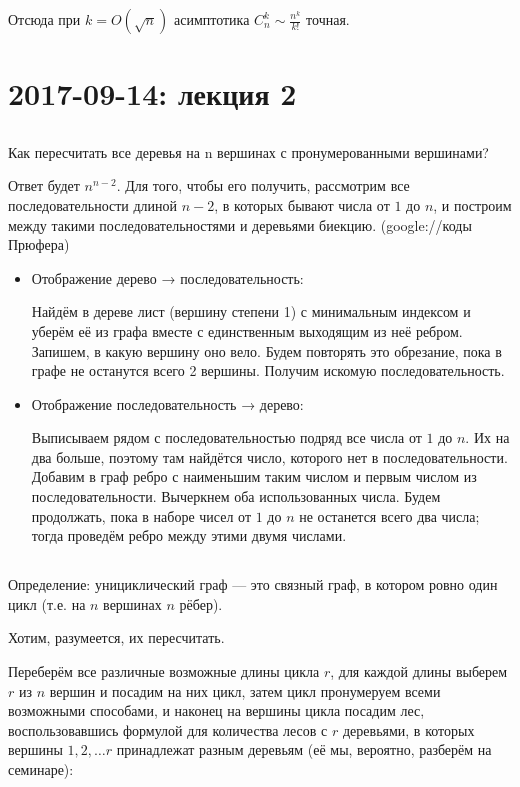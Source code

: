 \documentclass[12pt]{article}
\begin{document}
Отсюда при $k = O(\sqrt{n})$ асимптотика $C^k_n \sim \frac {n^k} {k!}$ точная.

\section{2017-09-14: лекция 2}

\subsection{}

Как пересчитать все деревья на n вершинах с пронумерованными вершинами?

Ответ будет $n^{n-2}$. Для того, чтобы его получить, рассмотрим все последовательности длиной $n-2$, в которых бывают числа от $1$ до $n$, и построим между такими последовательностями и деревьями биекцию. (google://коды Прюфера)

\begin{itemize}
\item Отображение дерево → последовательность:

Найдём в дереве лист (вершину степени 1) с минимальным индексом и уберём её из графа вместе с единственным выходящим из неё ребром. Запишем, в какую вершину оно вело. Будем повторять это обрезание, пока в графе не останутся всего 2 вершины. Получим искомую последовательность.

\item Отображение последовательность → дерево:

Выписываем рядом с последовательностью подряд все числа от $1$ до $n$. Их на два больше, поэтому там найдётся число, которого нет в последовательности. Добавим в граф ребро с наименьшим таким числом и первым числом из последовательности. Вычеркнем оба использованных числа. Будем продолжать, пока в наборе чисел от $1$ до $n$ не останется всего два числа; тогда проведём ребро между этими двумя числами.
\end{itemize}

\subsection{}

Определение: унициклический граф — это связный граф, в котором ровно один цикл (т.е. на $n$ вершинах $n$ рёбер).

Хотим, разумеется, их пересчитать.

Переберём все различные возможные длины цикла $r$, для каждой длины выберем $r$ из $n$ вершин и посадим на них цикл, затем цикл пронумеруем всеми возможными способами, и наконец на вершины цикла посадим лес, воспользовавшись формулой для количества лесов с $r$ деревьями, в которых вершины $1, 2, \ldots r$ принадлежат разным деревьям (её мы, вероятно, разберём на семинаре):
\end{document}
